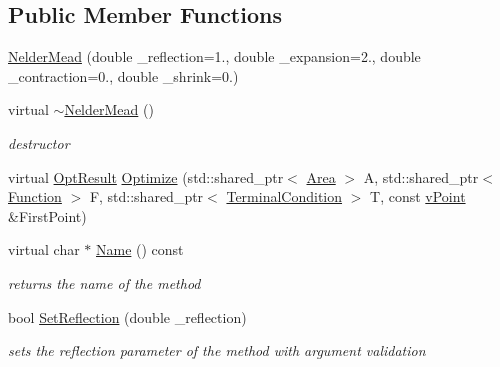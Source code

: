 \subsection*{Public Member Functions}
\begin{DoxyCompactItemize}
\item 
\hyperlink{class_nelder_mead_afbf2f00242cc95bd533c8bd6a5dfbba6}{Nelder\+Mead} (double \+\_\+reflection=1., double \+\_\+expansion=2., double \+\_\+contraction=0., double \+\_\+shrink=0.)
\item 
\mbox{\label{class_nelder_mead_a0b52b4a63babb9a1849c51de1445947c}} 
virtual \hyperlink{class_nelder_mead_a0b52b4a63babb9a1849c51de1445947c}{$\sim$\+Nelder\+Mead} ()
\begin{DoxyCompactList}\small\item\em destructor \end{DoxyCompactList}\item 
virtual \hyperlink{struct_opt_result}{Opt\+Result} \hyperlink{class_nelder_mead_a67ad06a8e8f67f6c6a28bfe2d61afd08}{Optimize} (std\+::shared\+\_\+ptr$<$ \hyperlink{class_area}{Area} $>$ A, std\+::shared\+\_\+ptr$<$ \hyperlink{class_function}{Function} $>$ F, std\+::shared\+\_\+ptr$<$ \hyperlink{class_terminal_condition}{Terminal\+Condition} $>$ T, const \hyperlink{classv_point}{v\+Point} \&First\+Point)
\item 
\mbox{\label{class_nelder_mead_a54134743c71c8790210b1249c577505e}} 
virtual char $\ast$ \hyperlink{class_nelder_mead_a54134743c71c8790210b1249c577505e}{Name} () const
\begin{DoxyCompactList}\small\item\em returns the name of the method \end{DoxyCompactList}\item 
\mbox{\label{class_nelder_mead_aa8844aa9b710ab1e611a071e8a2ef282}} 
bool \hyperlink{class_nelder_mead_aa8844aa9b710ab1e611a071e8a2ef282}{Set\+Reflection} (double \+\_\+reflection)
\begin{DoxyCompactList}\small\item\em sets the reflection parameter of the method with argument validation \end{DoxyCompactList}\item 
\mbox{\label{class_nelder_mead_a07345c18aa9b15bf061b7b040cb1c485}} 

\end{DoxyCompactItemize}
